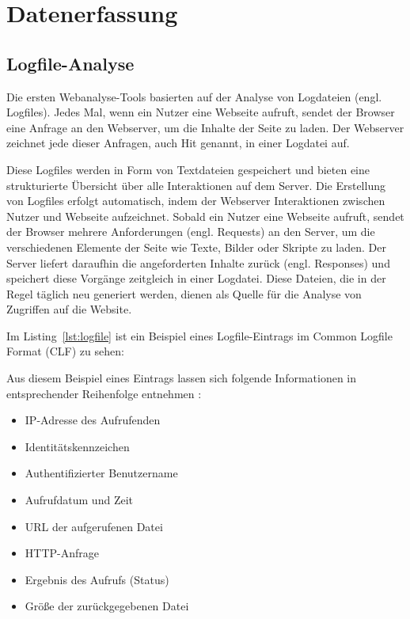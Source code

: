 \section{Datenerfassung}
\label{sec:Datenerfassung}
\subsection{Logfile-Analyse}
\label{sec:logfiles}
Die ersten Webanalyse-Tools basierten auf der Analyse von Logdateien (engl. Logfiles). Jedes Mal, wenn ein Nutzer eine Webseite aufruft, sendet der Browser eine Anfrage an den Webserver, um die Inhalte der Seite zu laden. Der Webserver zeichnet jede dieser Anfragen, auch \glqq Hit\grqq{} genannt, in einer Logdatei auf. \parencite[S.8]{Dykes2014}

Diese Logfiles werden in Form von Textdateien gespeichert und bieten eine strukturierte Übersicht über alle Interaktionen auf dem Server. Die Erstellung von Logfiles erfolgt automatisch, indem der Webserver Interaktionen zwischen Nutzer und Webseite aufzeichnet. Sobald ein Nutzer eine Webseite aufruft, sendet der Browser mehrere Anforderungen (engl. Requests) an den Server, um die verschiedenen Elemente der Seite wie Texte, Bilder oder Skripte zu laden. Der Server liefert daraufhin die angeforderten Inhalte zurück (engl. Responses) und speichert diese Vorgänge zeitgleich in einer Logdatei. Diese Dateien, die in der Regel täglich neu generiert werden, dienen als Quelle für die Analyse von Zugriffen auf die Website. \parencite[Kap.2.2]{Hassler2019}

Im Listing~\ref{lst:logfile} ist ein Beispiel eines Logfile-Eintrags im Common Logfile Format (CLF) zu sehen:



Aus diesem Beispiel eines Eintrags lassen sich folgende Informationen in entsprechender Reihenfolge entnehmen \parencite{ApacheLogFiles}: \\

\begin{itemize}
    \item IP-Adresse des Aufrufenden
    \item Identitätskennzeichen
    \item Authentifizierter Benutzername
    \item Aufrufdatum und Zeit
    \item URL der aufgerufenen Datei
    \item HTTP-Anfrage
    \item Ergebnis des Aufrufs (Status)
    \item Größe der zurückgegebenen Datei
\end{itemize}

